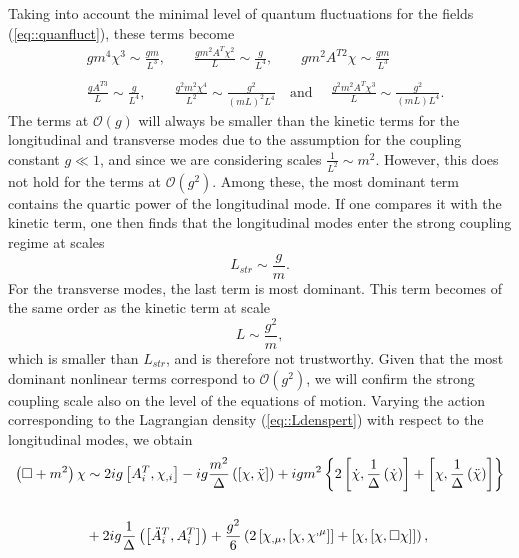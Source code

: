 \documentclass{article}
\begin{document}
Taking into account the minimal level of quantum fluctuations for the fields (\ref{eq::quanfluct}), these terms become
\begin{equation}
    \begin{split}
        &gm^4\chi^3\sim\frac{gm}{L^3},\qquad \frac{gm^2A^T\chi^2}{L}\sim\frac{g}{L^4},\qquad gm^2A^{T2}\chi\sim\frac{gm}{L^3} \\\\
        &\frac{gA^{T3}}{L}\sim\frac{g}{L^4},\qquad \frac{g^2m^2\chi^4}{L^2}\sim\frac{g^2}{\left(mL\right)^2L^4}\quad\text{and }\quad\frac{g^2m^2A^T\chi^3}{L}\sim\frac{g^2}{\left(mL\right)L^4}.
    \end{split}
\end{equation}
The terms at $\mathcal{O}(g)$ will always be smaller than the kinetic terms for the longitudinal and transverse modes due to the assumption for the coupling constant $g\ll1$, and since we are considering scales $\frac{1}{L^2}\sim m^2$. However, this does not hold for the terms at $\mathcal{O}(g^2)$. Among these, the most dominant term contains the quartic power of the longitudinal mode. If one compares it with the kinetic term, one then finds that the longitudinal modes enter the strong coupling regime at scales
\begin{equation}
    L_{str}\sim\frac{g}{m}.
\end{equation}
For the transverse modes, the last term is most dominant. This term becomes of the same order as the kinetic term at scale
\begin{equation}
    L\sim\frac{g^2}{m},
\end{equation}
which is smaller than $L_{str}$, and is therefore not trustworthy. Given that the most dominant nonlinear terms correspond to $\mathcal{O}\left(g^2\right)$, we will confirm the strong coupling scale also on the level of the equations of motion. Varying the action corresponding to the Lagrangian density (\ref{eq::Ldenspert}) with respect to the longitudinal modes, we obtain
\begin{equation}
    \begin{split}
        \left(\Box+m^2\right)\chi&\sim 2ig\left[A_i^T,\chi_{,i}\right]-ig\frac{m^2}{\Delta}\left(\left[\chi,\Ddot{\chi}\right]\right) +igm^2\left\{2\left[\dot{\chi},\frac{1}{\Delta}\left(\dot{\chi}\right)\right]+\left[\chi,\frac{1}{\Delta}\left(\Ddot{\chi}\right)\right]\right\}\\\\
        &+2ig\frac{1}{\Delta}\left(\left[\Ddot{A}_i^T,A_i^T\right]\right)+\frac{g^2}{6}\left(2\left[\chi_{,\mu},\left[\chi,\chi^{,\mu}\right]\right]+\left[\chi,\left[\chi,\Box\chi\right]\right]\right),
    \end{split}
\end{equation}
\end{document}
